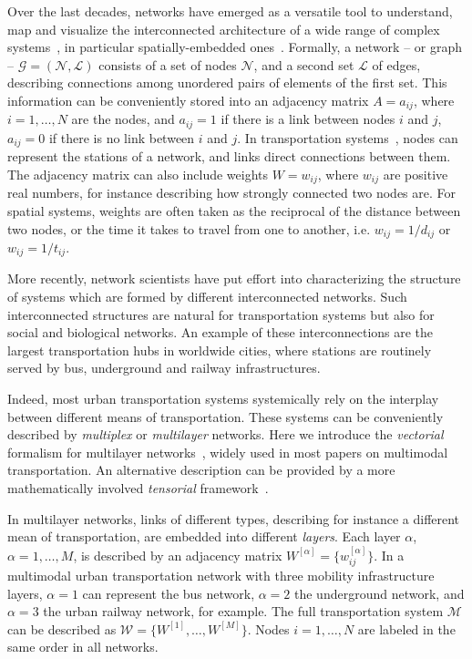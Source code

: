 Over the last decades, networks have emerged as a versatile tool to understand, map and visualize the interconnected architecture of a wide range of complex systems~\cite{albert2002statistical,dorogovtsev2002evolution, newman2003structure, boccaletti2006complex}, in particular spatially-embedded ones~\cite{barthelemy2011spatial, barthelemy2018morphogenesis}. Formally, a network -- or graph -- $\mathcal G = (\mathcal N, \mathcal L)$ consists of a set of nodes $\mathcal N$, and a second set $\mathcal L$ of edges, describing connections among unordered pairs of elements of the first set. This information can be conveniently stored into an adjacency matrix ${A=a_{ij}}$, where $i=1, \dots, N$ are the nodes, and $a_{ij}=1$ if there is a link between nodes $i$ and $j$, $a_{ij}=0$ if there is no link between $i$ and $j$. In transportation systems~\cite{lin2013complex}, nodes can represent the stations of a network, and links direct connections between them. The adjacency matrix can also include weights $W=w_{ij}$, where $w_{ij}$ are positive real numbers, for instance describing how strongly connected two nodes are. For spatial systems, weights are often taken as the reciprocal of the distance between two nodes, or the time it takes to travel from one to another, i.e. $w_{ij}=1/d_{ij}$ or $w_{ij}=1/t_{ij}$.

More recently, network scientists have put effort into characterizing the structure of systems which are formed by different interconnected networks. Such interconnected structures are natural for transportation systems but also for social and biological networks. An example of these interconnections are the largest transportation hubs in worldwide cities, where stations are routinely served by bus, underground and railway infrastructures.

Indeed, most urban transportation systems systemically rely on the interplay between different means of transportation. These systems can be conveniently described by \textit{multiplex} or \textit{multilayer} networks. Here we introduce the \textit{vectorial} formalism for multilayer networks~\cite{boccaletti2014structure, battiston2014structural}, widely used in most papers on multimodal transportation. An alternative description can be provided by a more mathematically involved \textit{tensorial} framework~\cite{dedomenico2013mathematical, kivela2014multilayer}.  

In multilayer networks, links of different types, describing for instance a different mean of transportation, are embedded into different \textit{layers}. Each layer $\alpha$, $\alpha = 1, \ldots, M$, is described by an adjacency matrix $W^{[\alpha]} = \{w_{ij}^{[\alpha]}\}$. In a multimodal urban transportation network with three mobility infrastructure layers, $\alpha=1$ can represent the bus network, $\alpha=2$ the underground network, and $\alpha=3$ the urban railway network, for example. The full transportation system $\mathcal M$ can be described as $\mathcal W = \{ W^{[1]}, \ldots,  W^{[M]}\}$. Nodes $i=1, \dots, N$ are labeled in the same order in all networks. 

